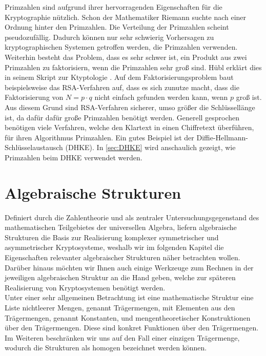 Primzahlen sind aufgrund ihrer hervorragenden Eigenschaften für die Kryptographie nützlich. Schon der Mathematiker Riemann suchte nach einer Ordnung hinter den Primzahlen. Die Verteilung der Primzahlen scheint pseudozufällig. Dadurch können nur sehr schwierig Vorhersagen zu kryptographischen Systemen getroffen werden, die Primzahlen verwenden. Weiterhin besteht das Problem, dass es sehr schwer ist, ein Produkt aus zwei Primzahlen zu faktorisiern, wenn die Primzahlen sehr groß sind. Hübl erklärt dies in seinem Skript zur Ktyptologie \cite[S. 93]{Dr.ReinholdHubl.2022}. Auf dem Faktorisierungsproblem baut beispielsweise das RSA-Verfahren auf, dass es sich zunutze macht, dass die Faktorisierung von $N = p \cdot q$ nicht einfach gefunden werden kann, wenn $p$ groß ist. Aus diesem Grund sind RSA-Verfahren sicherer, umso größer die Schlüssellänge ist, da dafür dafür große Primzahlen benötigt werden. Generell gesprochen benötigen viele Verfahren, welche den Klartext in einen Chiffretext überführen, für ihren Algorithmus Primzahlen. Ein gutes Beispiel ist der Diffie-Hellmann-Schlüsselaustausch (DHKE). In  \ref{sec:DHKE} wird anschaulich gezeigt, wie Primzahlen beim DHKE verwendet werden.

\section{Algebraische Strukturen}
Definiert durch die Zahlentheorie und als zentraler Untersuchungsgegenstand des mathematischen Teilgebietes der universellen Algebra, liefern algebraische Strukturen die Basis zur Realisierung komplexer symmetrischer und asymmetrischer Kryptosysteme, weshalb wir im folgenden Kapitel die Eigenschaften relevanter algebraischer Strukturen näher betrachten wollen. Darüber hinaus möchten wir Ihnen auch einige Werkzeuge zum Rechnen in der jeweiligen algebraischen Struktur an die Hand geben, welche zur späteren Realisierung von Kryptosystemen benötigt werden.\\

Unter einer sehr allgemeinen Betrachtung ist eine mathematische Struktur eine Liste nichtleerer Mengen, genannt Trägermengen, mit Elementen aus den Trägermengen, genannt Konstanten, und mengentheoretischer Konstruktionen über den Trägermengen. Diese sind konkret Funktionen über den Trägermengen. Im Weiteren beschränken wir uns auf den Fall einer einzigen Trägermenge, wodurch die Strukturen als homogen bezeichnet werden können.\cite[S. 355]{Berghammer.2021}

